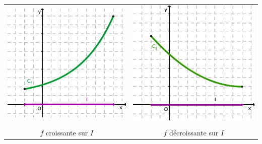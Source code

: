 \begin{center}
  \begin{tabular}{c@{\qquad \qquad}c}
    \begin{minipage}[c]{0.36\linewidth}
      \includegraphics[width=\textwidth]{F_Croissante}
    \end{minipage}
    &
    \begin{minipage}[c]{0.36\linewidth}
      \includegraphics[width=\textwidth]{F_Decroissante}
    \end{minipage}  \\
    & \\
    $f$ croissante sur $I$
    &
    $f$ décroissante sur $I$
  \end{tabular}
\end{center}


